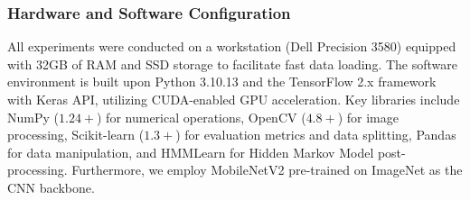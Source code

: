 \documentclass[conference]{IEEEtran}
\begin{document}


\subsubsection{Hardware and Software Configuration}
All experiments were conducted on a workstation (Dell Precision 3580) equipped with 32GB of RAM and SSD storage to facilitate fast data loading. The software environment is built upon Python 3.10.13 and the TensorFlow 2.x framework with Keras API, utilizing CUDA-enabled GPU acceleration. Key libraries include NumPy ($1.24+$) for numerical operations, OpenCV ($4.8+$) for image processing, Scikit-learn ($1.3+$) for evaluation metrics and data splitting, Pandas for data manipulation, and HMMLearn for Hidden Markov Model post-processing. Furthermore, we employ MobileNetV2 pre-trained on ImageNet as the CNN backbone.
\end{document}
